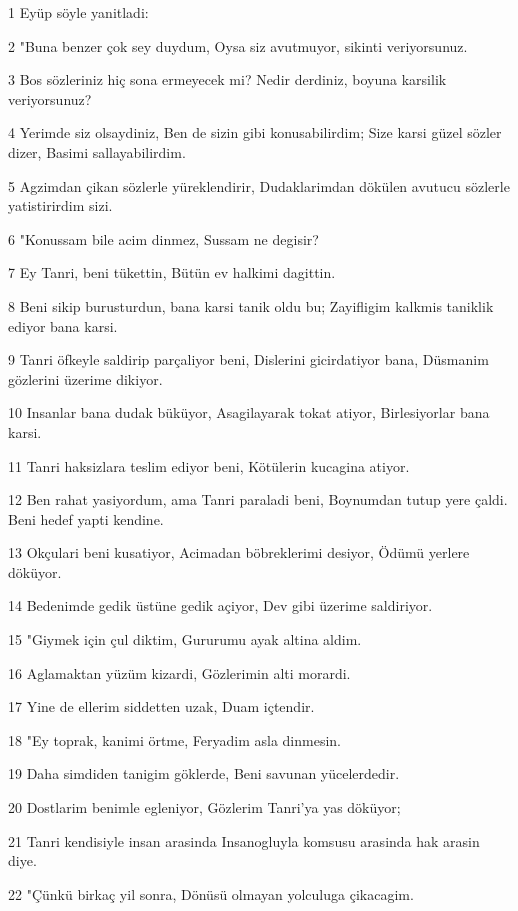 \par 1 Eyüp söyle yanitladi:
\par 2 "Buna benzer çok sey duydum, Oysa siz avutmuyor, sikinti veriyorsunuz.
\par 3 Bos sözleriniz hiç sona ermeyecek mi? Nedir derdiniz, boyuna karsilik veriyorsunuz?
\par 4 Yerimde siz olsaydiniz, Ben de sizin gibi konusabilirdim; Size karsi güzel sözler dizer, Basimi sallayabilirdim.
\par 5 Agzimdan çikan sözlerle yüreklendirir, Dudaklarimdan dökülen avutucu sözlerle yatistirirdim sizi.
\par 6 "Konussam bile acim dinmez, Sussam ne degisir?
\par 7 Ey Tanri, beni tükettin, Bütün ev halkimi dagittin.
\par 8 Beni sikip burusturdun, bana karsi tanik oldu bu; Zayifligim kalkmis taniklik ediyor bana karsi.
\par 9 Tanri öfkeyle saldirip parçaliyor beni, Dislerini gicirdatiyor bana, Düsmanim gözlerini üzerime dikiyor.
\par 10 Insanlar bana dudak büküyor, Asagilayarak tokat atiyor, Birlesiyorlar bana karsi.
\par 11 Tanri haksizlara teslim ediyor beni, Kötülerin kucagina atiyor.
\par 12 Ben rahat yasiyordum, ama Tanri paraladi beni, Boynumdan tutup yere çaldi. Beni hedef yapti kendine.
\par 13 Okçulari beni kusatiyor, Acimadan böbreklerimi desiyor, Ödümü yerlere döküyor.
\par 14 Bedenimde gedik üstüne gedik açiyor, Dev gibi üzerime saldiriyor.
\par 15 "Giymek için çul diktim, Gururumu ayak altina aldim.
\par 16 Aglamaktan yüzüm kizardi, Gözlerimin alti morardi.
\par 17 Yine de ellerim siddetten uzak, Duam içtendir.
\par 18 "Ey toprak, kanimi örtme, Feryadim asla dinmesin.
\par 19 Daha simdiden tanigim göklerde, Beni savunan yücelerdedir.
\par 20 Dostlarim benimle egleniyor, Gözlerim Tanri'ya yas döküyor;
\par 21 Tanri kendisiyle insan arasinda Insanogluyla komsusu arasinda hak arasin diye.
\par 22 "Çünkü birkaç yil sonra, Dönüsü olmayan yolculuga çikacagim.

